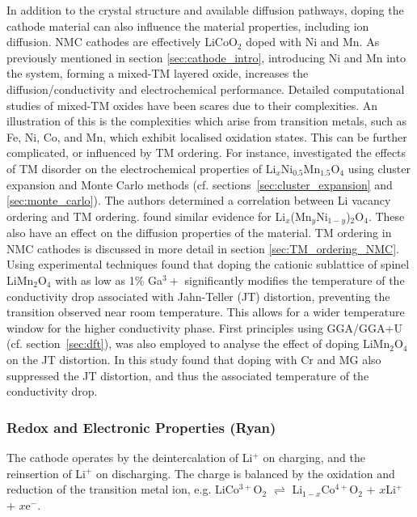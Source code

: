 \documentclass[../main.tex]{subfiles}
\begin{document}
In addition to the crystal structure and available diffusion pathways, doping the cathode material can also influence the material properties, including ion diffusion. NMC cathodes are effectively LiCoO$_2$ doped with Ni and Mn. As previously mentioned in section \ref{sec:cathode_intro}, introducing Ni and Mn into the system, forming a mixed-TM layered oxide, increases the diffusion/conductivity and electrochemical performance. Detailed computational studies of mixed-TM oxides have been scares due to their complexities. An illustration of this is the complexities which arise from transition metals, such as Fe, Ni, Co, and Mn, which exhibit localised oxidation states. This can be further complicated, or influenced by TM ordering. For instance, \citeauthor{lee2013solid} investigated the effects of TM disorder on the electrochemical properties of Li$_x$Ni$_{0.5}$Mn$_{1.5}$O$_4$ using cluster expansion and Monte Carlo methods (cf. sections~\ref{sec:cluster_expansion} and \ref{sec:monte_carlo}). The authors determined a correlation between Li vacancy ordering and TM ordering. \cite{lee2013solid} \citeauthor{hao2016quaternary} found similar evidence for Li$_x$(Mn$_y$Ni$_{1-y}$)$_2$O$_4$. \cite{hao2016quaternary} These also have an effect on the diffusion properties of the material. TM ordering in NMC cathodes is discussed in more detail in section \ref{sec:TM_ordering_NMC}. Using experimental techniques \citeauthor{capsoni2002inhibition} found that doping the cationic sublattice of spinel LiMn$_2$O$_4$ with as low as 1\% Ga${^3+}$ significantly modifies the temperature of the conductivity drop associated with Jahn-Teller (JT) distortion, preventing the transition observed near room temperature. \cite{capsoni2002inhibition} This allows for a wider temperature window for the higher conductivity phase. First principles using GGA/GGA+U (cf. section~\ref{sec:dft}), was also employed to analyse the effect of doping LiMn$_2$O$_4$ on the JT distortion. In this study \citeauthor{singh2009suppression} found that doping with Cr and MG also suppressed the JT distortion, and thus the associated temperature of the conductivity drop. \cite{singh2009suppression} 

\subsubsection{Redox and Electronic Properties (Ryan)}
The cathode operates by the deintercalation of Li$^+$ on charging, and the reinsertion of Li$^+$ on discharging. The charge is balanced by the oxidation and reduction of the transition metal ion, e.g. LiCo$^{3+}$O$_2$ $\rightleftharpoons$ Li$_{1-x}$Co$^{4+}$O$_2$ + $x$Li$^+$ + $x$e$^-$. 
\end{document}
